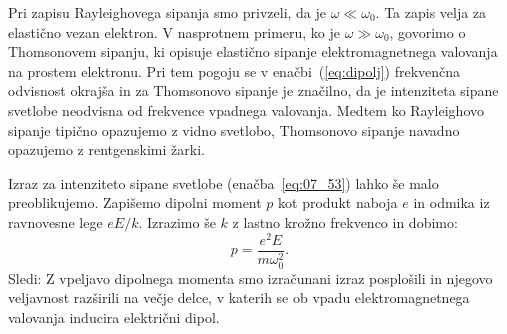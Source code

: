 \begin{remark}
Pri zapisu Rayleighovega sipanja smo privzeli, da je $\omega \ll \omega_0$. Ta zapis
velja za elastično vezan elektron. V nasprotnem primeru, ko je $\omega \gg \omega_0$, 
govorimo o Thomsonovem sipanju, ki opisuje elastično sipanje elektromagnetnega valovanja 
na prostem elektronu. Pri tem pogoju se v enačbi~(\ref{eq:dipolj}) frekvenčna 
odvisnost okrajša in za Thomsonovo sipanje je značilno, da je intenziteta
sipane svetlobe neodvisna od frekvence vpadnega valovanja. 
Medtem ko Rayleighovo sipanje tipično opazujemo z vidno
svetlobo, Thomsonovo sipanje navadno opazujemo z rentgenskimi žarki.
\end{remark}

Izraz za intenziteto sipane svetlobe (enačba~\ref{eq:07_53}) lahko še malo 
preoblikujemo. Zapišemo dipolni moment $p$ kot produkt naboja $e$ in odmika 
iz ravnovesne lege $eE/k$. Izrazimo še $k$ z lastno krožno frekvenco in dobimo:
\begin{equation}
p = \frac{e^2 E}{m\omega_0^2}.
\label{eq:07_54}
\end{equation}
Sledi:
Z vpeljavo dipolnega momenta smo izračunani izraz posplošili in njegovo
veljavnost razširili na večje delce, v katerih se ob vpadu elektromagnetnega 
valovanja inducira električni dipol.

